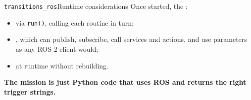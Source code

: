 \begin{frame}{\texttt{transitions\_ros}}{Runtime considerations}
  \justifying
  Once started, the :
  \begin{itemize}
    \item {} via \texttt{run()}, calling each routine in turn;
    \item {}, which can publish, subscribe, call services and actions, and use parameters as any ROS 2 client would;
    \item {} at runtime without rebuilding.
  \end{itemize}
  \bigskip
  \begin{block}{}
    \centering
    \textbf{The mission is just Python code that uses ROS and returns the right trigger strings.}
  \end{block}
  \bigskip
  \begin{alertblock}{}
    \centering
  \end{alertblock}
\end{frame}

